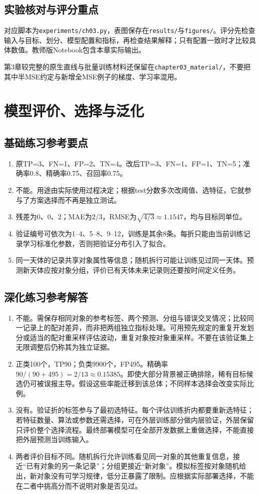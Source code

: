 \section*{实验核对与评分重点}
对应脚本为\texttt{experiments/ch03.py}，表图保存在\texttt{results/}与\texttt{figures/}。评分先检查输入与目标、划分、模型配置和指标，再检查结果解释；只有配置一致时才比较具体数值。教师版Notebook包含本章实际输出。

第3章较完整的原生直线与批量训练材料还保留在\texttt{chapter03\_material/}，不要把其中半MSE约定与新增全MSE例子的梯度、学习率混用。

\chapter{模型评价、选择与泛化}
\section*{基础练习参考要点}
\begin{enumerate}[label=\arabic*.]
\item 原TP=3、FN=1、FP=2、TN=4。改后TP=3、FN=1、FP=1、TN=5；准确率0.8、精确率0.75、召回率0.75。
\item 不能。用途由实际使用过程决定；根据test分数多次改阈值、选特征，它就参与了方案选择而不再是独立测试。
\item 残差为0、0、2；MAE为$2/3$，RMSE为$\sqrt{4/3}\approx1.1547$，均与目标同单位。
\item 验证编号可依次为1--4、5--8、9--12，训练是其余8条。每折只能由当前训练记录学习标准化参数，否则把验证分布引入了拟合。
\item 同一天体的记录共享对象属性等信息；随机拆行可能让训练见过同一天体。预测新天体应按对象分组，评价已有天体未来记录则还要按时间定义任务。
\end{enumerate}
\section*{深化练习参考解答}
\begin{enumerate}[label=D\arabic*.]
\item 不能。需保存相同对象的参考标签、两个预测、分组与错误交叉情况；比较同一记录上的配对差异，而非把两组独立指标处理。可用预先规定的重复开发划分或适当的配对重采样评估波动，重复对象按对象重采样。不要在该验证集上无限调整后仍称其为独立证据。
\item 正类100个，TP90；负类9900个，FP495。精确率$90/(90+495)=2/13\approx0.15385$。即使大部分背景被正确排除，稀有目标候选仍可被误报主导。假设这些率能迁移到该总体；不同样本选择会改变实际比例。
\item 没有。验证折的标签参与了最初选特征。每个评估训练折内都要重新选特征；若特征数量、算法或参数还需选择，可在外层训练部分做内层验证，外层保留只评价整个选择流程。最终部署模型可在全部开发数据上重做选择，不能直接把外层预测当训练输入。
\item 两者评价目标不同。随机拆行允许训练看见同一对象的其他重复信息，接近“已有对象的另一条记录”；分组更接近“新对象”。模拟标签按对象随机给出，新对象没有可学习规律，低分正暴露了限制。应根据实际部署选择，不能在二者中挑高分而不说明对象是否见过。
\end{enumerate}

